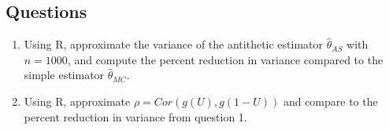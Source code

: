 \documentclass[12pt]{article}
\begin{document}
\newpage

\subsection*{Questions}

\begin{enumerate}
\item Using R, approximate the variance of the antithetic estimator $\widehat{\theta}_{AS}$ with $n = 1000$, and compute the percent reduction in variance compared to the simple estimator $\widehat{\theta}_{MC}$.

\vspace{6cm}

\item Using R, approximate $\rho = Cor(g(U), g(1 - U))$ and compare to the percent reduction in variance from question 1.
\end{enumerate}
\end{document}
